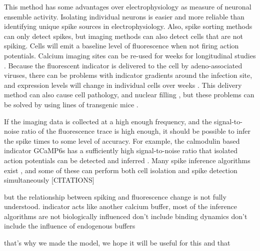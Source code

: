 This method has some advantages over electrophysiology as measure of neuronal ensemble activity. Isolating individual neurons is easier and more reliable than identifying unique spike sources in electrophysiology. Also, spike sorting methods can only detect spikes, but imaging methods can also detect cells that are not spiking. Cells will emit a baseline level of fluorescence when not firing action potentials. Calcium imaging sites can be re-used for weeks for longitudinal studies \parencite{chen}. Because the fluorescent indicator is delivered to the cell by adeno-associated viruses, there can be problems with indicator gradients around the infection site, and expression levels will change in individual cells over weeks \parencite{tian, chen}. This delivery method can also cause cell pathology, and nuclear filling \parencite{zariwala}, but these problems can be solved by using lines of transgenic mice \parencite{dana}.

If the imaging data is collected at a high enough frequency, and the signal-to-noise ratio of the fluorescence trace is high enough, it should be possible to infer the spike times to some level of accuracy. For example, the calmodulin based indicator GCaMP6s has a sufficiently high signal-to-noise ratio that isolated action potentials can be detected and inferred \parencite{chen}. Many spike inference algorithms exist \parencite{vogelstein, pnevmatikakis, friedrich, paninski1, paninski2, deneux, greenberg}, and some of these can perform both cell isolation and spike detection simultaneously [CITATIONS]

but the relationship between spiking and fluorescence change is not fully understood.
indicator acts like another calcium buffer,
most of the inference algorithms are not biologically influenced
don't include binding dynamics
don't include the influence of endogenous buffers

that's why we made the model,
we hope it will be useful for this and that
